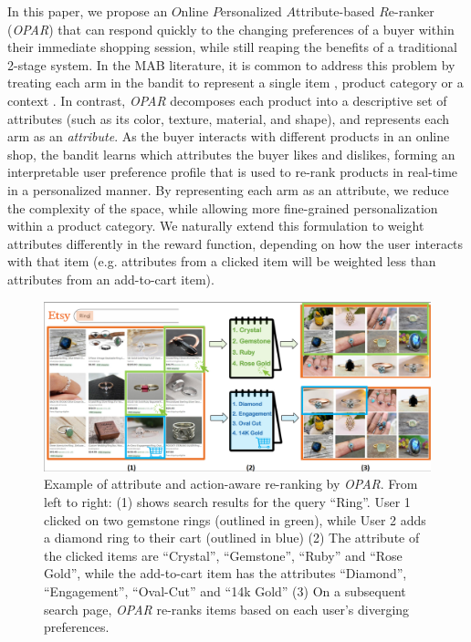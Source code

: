 \documentclass[11pt, dvipdfmx]{article}
\begin{document}
In this paper, we propose an $O$nline $P$ersonalized $A$ttribute-based $R$e-ranker (\emph{OPAR}) that can respond quickly to the changing preferences of a buyer within their immediate shopping session, while still reaping the benefits of a traditional 2-stage system. In the MAB literature, it is common to address this problem by treating each arm in the bandit to represent a single item \cite{kdd20_sequentialRec}, product category \cite{recsys16_amazon,MLKD19_JD_onlineRanking} or a context  \cite{KDD18_TaobaoSearch_RL, li2017contextaware,ICML16_contextCascadingBandits}. In contrast, \emph{OPAR} decomposes each product into a descriptive set of attributes (such as its color, texture, material, and shape), and represents each arm as an \emph{attribute}. As the buyer interacts with different products in an online shop, the bandit learns which attributes the buyer likes and dislikes, forming an interpretable user preference profile that is used to re-rank products in real-time in a personalized manner. By representing each arm as an attribute, we reduce the complexity of the space, while allowing more fine-grained personalization within a product category. We naturally extend this formulation to weight attributes differently in the reward function, depending on how the user interacts with that item (e.g. attributes from a clicked item will be weighted less than attributes from an add-to-cart item). 


\begin{figure}[!h]
    \centering
    \includegraphics[bb=-145 0 145 100]{submissions/in_session_ranking/figs/fig_toy-cropped_png}
    \caption{Example of attribute and action-aware re-ranking by \emph{OPAR}. From left to right: (1) shows search results for the query ``Ring''. User 1 clicked on two gemstone rings (outlined in green), while User 2 adds a diamond ring to their cart (outlined in blue) (2) The attribute of the clicked items are ``Crystal'', ``Gemstone'', ``Ruby'' and ``Rose Gold'', while the add-to-cart item has the attributes ``Diamond'', ``Engagement'', ``Oval-Cut'' and ``14k Gold'' (3) On a subsequent search page, \emph{OPAR} re-ranks items based on each user's diverging preferences.}
\label{fig:toy}
\end{figure}
\end{document}
